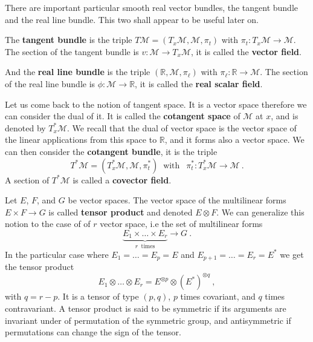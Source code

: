 \documentclass[10pt]{book}
\newcommand{\Mcal}{\mathcal{M}}
\newcommand{\Rbb}{\mathbb{R}}
\theoremstyle{break}
\begin{document}
\bigskip


There are important particular smooth real vector bundles, the tangent bundle and the real line bundle. This two shall appear to be useful later on. 


\bigskip


The \textbf{tangent bundle} is the triple $T\Mcal=(T_x\Mcal, \Mcal, \pi_t)$ with $\pi_t : T_x\Mcal \to \Mcal$. The section of the tangent bundle is $v : \Mcal \to T_x\Mcal$, it is called the \textbf{vector field}. 


\bigskip


And the \textbf{real line bundle} is the triple $(\Rbb, \Mcal, \pi_\ell)$ with $\pi_\ell : \Rbb \to \Mcal$. The section of the real line bundle is $\phi : \Mcal \to \Rbb$, it is called the \textbf{real scalar field}. 


\bigskip


Let us come back to the notion of tangent space. It is a vector space therefore we can consider the dual of it. It is called the \textbf{cotangent space} of $\Mcal$ at $x$, and is denoted by $T^\ast_x\Mcal$. We recall that the dual of vector space is the vector space of the linear applications from this space to $\Rbb$, and it forms also a vector space. We can then consider the \textbf{cotangent bundle}, it is the triple
%
\begin{equation*}
T^\ast\Mcal=(T^\ast_x\Mcal, \Mcal, \pi^\ast_t) \ \mbox{ with } \ \ \pi^\ast_t : T^\ast_x\Mcal \to \Mcal \ .
\end{equation*}
%
A section of $T^\ast\Mcal$ is called a \textbf{covector field}.


\bigskip


Let $E$, $F$, and $G$ be vector spaces. The vector space of the multilinear forms $E \times F \to G$ is called \textbf{tensor product} and denoted $E \otimes F$. We can generalize this notion to the case of of $r$ vector space, i.e the set of multilinear forms
%
\begin{equation*}
\underbrace{E_1 \times \dots \times E_r}_{r \ \mbox{ times}} \to G \ .
\end{equation*}
%
In the particular case where $E_1 = \dots = E_p = E$ and $E_{p+1} = \dots = E_r = E^\ast$ we get the tensor product 
%
\begin{equation*}
E_1 \otimes \dots \otimes E_r = E^{\otimes p} \otimes (E^\ast)^{\otimes q} \ ,
\end{equation*}
%
with $q=r-p$. It is a tensor of type $(p,q)$, $p$ times covariant, and $q$ times contravariant. A tensor product is said to be symmetric if its arguments are invariant under of permutation of the symmetric group, and antisymmetric if permutations can change the sign of the tensor.
\end{document}
